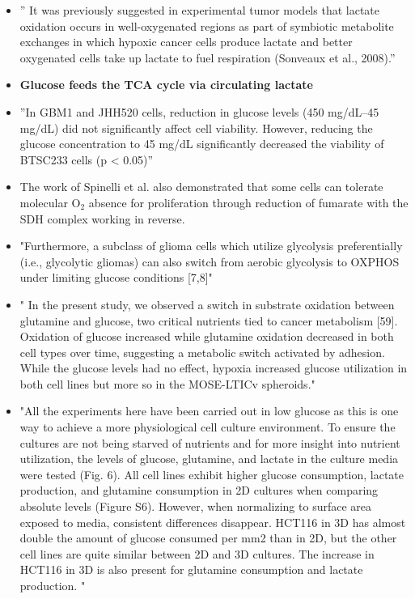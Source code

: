 \documentclass[11pt,a4paper]{article}
\begin{document}
\begin{itemize}
\item ” It was previously suggested in experimental tumor models that lactate oxidation occurs in well-oxygenated regions as part of symbiotic metabolite exchanges in which hypoxic cancer cells produce lactate and better oxygenated cells take up lactate to fuel respiration (Sonveaux et al., 2008).”\cite{Faubert2017}

\item \textbf{Glucose feeds the TCA cycle via circulating lactate}  \cite{Hui2017}
 
\item ”In GBM1 and JHH520 cells, reduction in glucose levels (450 mg/dL–45 mg/dL) did not significantly affect cell viability. However, reducing the glucose concentration to 45 mg/dL significantly decreased the viability of BTSC233 cells (p < 0.05)” \cite{Yusuf2022}

\item The work of Spinelli et al. also demonstrated that some cells can tolerate molecular O$_{2}$ absence for proliferation through reduction of fumarate with the SDH complex working in reverse. \cite{Spinelli2021}

\item "Furthermore, a subclass of glioma cells which utilize glycolysis preferentially (i.e., glycolytic gliomas) can also switch from aerobic glycolysis to OXPHOS under limiting glucose
conditions [7,8]"\cite{Jose2010}

\item " In the present study, we observed a switch in substrate oxidation between glutamine and glucose, two critical nutrients tied to cancer metabolism [59]. Oxidation of glucose increased while glutamine oxidation decreased in both cell types over time, suggesting a metabolic switch activated by adhesion. While the glucose levels had no effect, hypoxia increased glucose utilization in both cell lines but more so in the MOSE-LTICv spheroids." \cite{Compton2022}

\item "All the experiments here have been carried out in low glucose as this is one way to achieve a more physiological cell culture environment. To ensure the cultures are not being starved of nutrients and for more insight into nutrient utilization, the levels of glucose, glutamine, and lactate in the culture media were tested (Fig. 6). All cell lines exhibit higher glucose consumption, lactate production, and glutamine consumption in 2D cultures when comparing absolute levels (Figure S6). However, when normalizing to surface area exposed to media, consistent differences disappear. HCT116 in 3D has almost double the amount of glucose consumed per mm2 than in 2D, but the other cell lines are quite similar between 2D and 3D cultures. The increase in HCT116 in 3D is also present for glutamine consumption and lactate production. "\cite{Tidwell2022}


\end{itemize}
\end{document}
